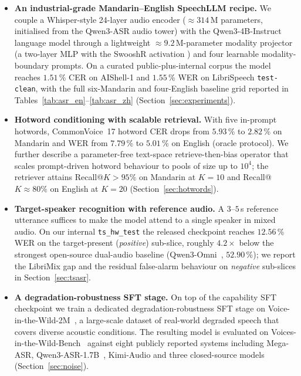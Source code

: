 \begin{itemize}
  \item \textbf{An industrial-grade Mandarin--English SpeechLLM
        recipe.} We couple a Whisper-style 24-layer audio encoder
        ($\approx\!314$\,M parameters, initialised from the
        Qwen3-ASR audio tower) with the Qwen3-4B-Instruct
        \cite{qwen2025qwen3} language model through a lightweight
        $\approx\!9.2$\,M-parameter modality projector (a two-layer
        MLP with the SwooshR activation \cite{yao2024zipformer})
        and four learnable modality-boundary prompts. On a curated
        public-plus-internal corpus the model reaches $1.51$\,\%
        CER on AIShell-1 and $1.55$\,\% WER on LibriSpeech
        \texttt{test-clean}, with the full six-Mandarin and
        four-English baseline grid reported in
        Tables~\ref{tab:asr_en}--\ref{tab:asr_zh}
        (Section~\ref{sec:experiments}).
  \item \textbf{Hotword conditioning with scalable retrieval.}
        With five in-prompt hotwords, CommonVoice~17 hotword CER
        drops from $5.93$\,\% to $2.82$\,\% on Mandarin and WER
        from $7.79$\,\% to $5.01$\,\% on English (oracle protocol).
        We further describe a parameter-free text-space
        retrieve-then-bias operator that scales prompt-driven hotword
        behaviour to pools of size up to $10^4$; the retriever
        attains Recall@$K{>}95\%$ on Mandarin at $K=10$ and
        Recall@$K{\approx}80\%$ on English at $K=20$
        (Section~\ref{sec:hotwords}).
  \item \textbf{Target-speaker recognition with reference audio.}
        A $3$--$5$\,s reference utterance suffices to make the
        model attend to a single speaker in mixed audio. On our
        internal \texttt{ts\_hw\_test} the released checkpoint
        reaches $12.56$\,\% WER on the target-present
        (\emph{positive}) sub-slice, roughly $4.2\times$ below the
        strongest open-source dual-audio baseline
        (Qwen3-Omni~\cite{xu2025qwen25omni}, $52.90$\,\%); we
        report the LibriMix gap and the residual false-alarm
        behaviour on \emph{negative} sub-slices in
        Section~\ref{sec:tsasr}.
  \item \textbf{A degradation-robustness SFT stage.} On top of the
        capability SFT checkpoint we train a dedicated
        degradation-robustness SFT stage on Voice-in-the-Wild-2M~\cite{xie2026mega},
        a large-scale dataset of real-world degraded speech that
        covers diverse acoustic conditions. The resulting model is
        evaluated on Voices-in-the-Wild-Bench~\cite{xie2026mega}
        against eight publicly reported systems including Mega-ASR,
        Qwen3-ASR-1.7B~\cite{qwen2025qwen3asr}, Kimi-Audio
        \cite{kimiaudio2025} and three closed-source models
        (Section~\ref{sec:noise}).
\end{itemize}


